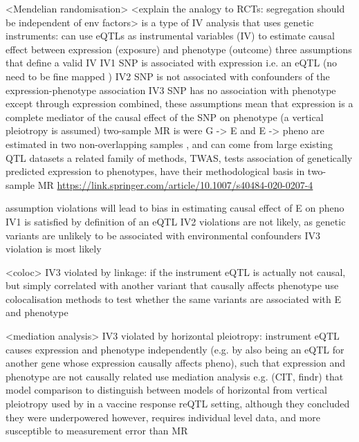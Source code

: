 \begin{outline}
\1 <Mendelian randomisation>
    \2 <explain the analogy to RCTs: segregation should be independent of env factors>
    \2 is a type of IV analysis that uses genetic instruments: can use eQTLs as instrumental variables (IV) to estimate causal effect between expression (exposure) and phenotype (outcome)
    \2 three assumptions that define a valid IV \autocite{daveysmith2014MendelianRandomizationGenetic,hemani2018EvaluatingPotentialRole,neumeyer2020StrengtheningCausalInference}
        \3 IV1 SNP is associated with expression i.e. an eQTL (no need to be fine mapped \autocite{daveysmith2014MendelianRandomizationGenetic,burgess2018InferringCausalRelationships})
        \3 IV2 SNP is not associated with confounders of the expression-phenotype association 
        \3 IV3 SNP has no association with phenotype except through expression 
    \2 combined, these assumptions mean that expression is a complete mediator of the causal effect of the SNP on phenotype (a vertical pleiotropy is assumed)
    \2 two-sample MR is were G -> E and E -> pheno are estimated in two non-overlapping samples \autocite{hemani2018EvaluatingPotentialRole,neumeyer2020StrengtheningCausalInference}, and can come from large existing QTL datasets
        \3 a related family of methods, TWAS, tests association of genetically predicted expression to phenotypes, have their methodological basis in two-sample MR \url{https://link.springer.com/article/10.1007/s40484-020-0207-4}

\1 assumption violations will lead to bias in estimating causal effect of E on pheno
    \2 IV1 is satisfied by definition of an eQTL
    \2 IV2 violations are not likely, as genetic variants are unlikely to be associated with environmental confounders 
    \2 IV3 violation is most likely

\1 <coloc>
    \2 IV3 violated by linkage: if the instrument eQTL is actually not causal, but simply correlated with another variant that causally affects phenotype
        \3 use colocalisation methods to test whether the same variants are associated with E and phenotype \autocite{hemani2018EvaluatingPotentialRole}

\1 <mediation analysis>
    \2 IV3 violated by horizontal pleiotropy: instrument eQTL causes expression and phenotype independently (e.g. by also being an eQTL for another gene whose expression causally affects pheno), such that expression and phenotype are not causally related
    \2 use mediation analysis e.g. (CIT\autocite{millstein2009DisentanglingMolecularRelationships}, findr\autocite{wang2017EfficientAccurateCausal}) that model comparison to distinguish between models of horizontal from vertical pleiotropy
        \3 \autocite{millstein2009DisentanglingMolecularRelationships} used by \textcite{franco2013IntegrativeGenomicAnalysis} in a vaccine response reQTL setting, although they concluded they were underpowered
    \2 however, requires individual level data, and more susceptible to measurement error than MR \autocite{hemani2018EvaluatingPotentialRole}


\end{outline}
